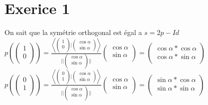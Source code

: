 \documentclass{article}
\author{Frederic Becerril}
\newcommand{\scalaire}[2]{\left< #1 | #2\right>}
\begin{document}
\part*{Exerice 1}

On sait que la symétrie orthogonal est égal a $s = 2p - Id$\\
$p(\begin{pmatrix}
    1\\
    0\\
\end{pmatrix}) = \frac{\scalaire{\begin{pmatrix}
    1\\
    0\\
\end{pmatrix}}{\begin{pmatrix}
    \cos \alpha\\
    \sin \alpha
\end{pmatrix}}}{||\begin{pmatrix}
    \cos \alpha\\
    \sin \alpha\\
\end{pmatrix}||} \begin{pmatrix}
    \cos \alpha\\
    \sin \alpha\\
\end{pmatrix} = \begin{pmatrix}
    \cos \alpha * \cos \alpha\\
    \cos \alpha * \sin \alpha\\
\end{pmatrix}$\\
$p(\begin{pmatrix}
    0\\
    1\\
\end{pmatrix}) = \frac{\scalaire{\begin{pmatrix}
    0\\
    1\\
\end{pmatrix}}{\begin{pmatrix}
    \cos \alpha\\
    \sin \alpha
\end{pmatrix}}}{||\begin{pmatrix}
    \cos \alpha\\
    \sin \alpha\\
\end{pmatrix}||} \begin{pmatrix}
    \cos \alpha\\
    \sin \alpha\\
\end{pmatrix} = \begin{pmatrix}
    \sin \alpha * \cos \alpha\\
    \sin \alpha * \sin \alpha\\
\end{pmatrix}$\\
\end{document}
